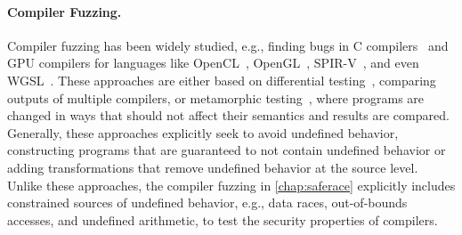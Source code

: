 \paragraph{Compiler Fuzzing.} Compiler fuzzing has been widely studied, e.g., finding bugs in C compilers~\cite{yang2011csmith} and GPU compilers for languages like OpenCL~\cite{lidbury2015clsmith}, OpenGL~\cite{donaldson2017graphicsfuzz}, SPIR-V~\cite{donaldson2021spirvfuzz}, and even WGSL~\cite{lecoeur2023reconditioning}. These approaches are either based on differential testing~\cite{mckeeman1998differential}, comparing outputs of multiple compilers, or metamorphic testing~\cite{chen1998metamorphic}, where programs are changed in ways that should not affect their semantics and results are compared. Generally, these approaches explicitly seek to avoid undefined behavior, constructing programs that are guaranteed to not contain undefined behavior or adding transformations that remove undefined behavior at the source level. Unlike these approaches, the compiler fuzzing in \mychap\ref{chap:saferace} explicitly includes constrained sources of undefined behavior, e.g., data races, out-of-bounds accesses, and undefined arithmetic, to test the security properties of compilers.
